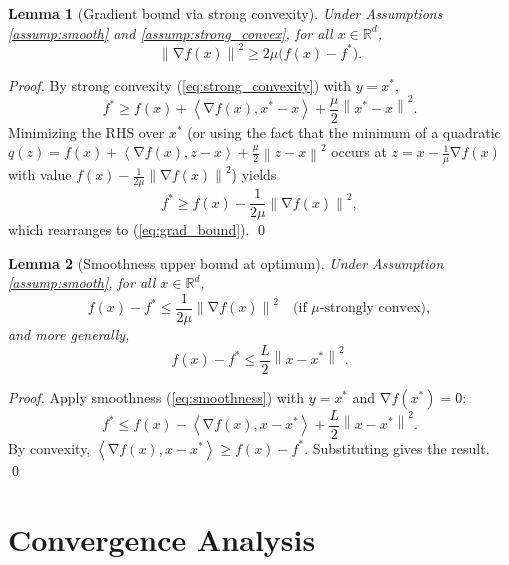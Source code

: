 \documentclass[11pt]{article}
\newtheorem{lemma}{Lemma}
\DeclareMathOperator{\grad}{\nabla}
\newcommand{\norm}[1]{\left\|#1\right\|}
\newcommand{\inner}[2]{\left\langle #1, #2 \right\rangle}
\newcommand{\R}{\mathbb{R}}
\begin{document}
\begin{lemma}[Gradient bound via strong convexity] \label{lem:grad_bound}
    Under Assumptions \ref{assump:smooth} and \ref{assump:strong_convex}, for all $x \in \R^d$,
    \begin{equation}
        \norm{\grad f(x)}^2 \ge 2\mu \bigl( f(x) - f^* \bigr).
        \label{eq:grad_bound}
    \end{equation}
\end{lemma}
\begin{proof}
    By strong convexity (\ref{eq:strong_convexity}) with $y = x^*$,
    \begin{equation}
        f^* \ge f(x) + \inner{\grad f(x)}{x^* - x} + \frac{\mu}{2}\norm{x^* - x}^2.
    \end{equation}
    Minimizing the RHS over $x^*$ (or using the fact that the minimum of a quadratic $q(z) = f(x) + \inner{\grad f(x)}{z-x} + \frac{\mu}{2}\norm{z-x}^2$ occurs at $z = x - \frac{1}{\mu}\grad f(x)$ with value $f(x) - \frac{1}{2\mu}\norm{\grad f(x)}^2$) yields
    \begin{equation}
        f^* \ge f(x) - \frac{1}{2\mu}\norm{\grad f(x)}^2,
    \end{equation}
    which rearranges to (\ref{eq:grad_bound}). \qed
\end{proof}

\begin{lemma}[Smoothness upper bound at optimum] \label{lem:smooth_opt}
    Under Assumption \ref{assump:smooth}, for all $x \in \R^d$,
    \begin{equation}
        f(x) - f^* \le \frac{1}{2\mu} \norm{\grad f(x)}^2 \quad \text{(if $\mu$-strongly convex)},
    \end{equation}
    and more generally,
    \begin{equation}
        f(x) - f^* \le \frac{L}{2} \norm{x - x^*}^2.
        \label{eq:smooth_opt}
    \end{equation}
\end{lemma}
\begin{proof}
    Apply smoothness (\ref{eq:smoothness}) with $y = x^*$ and $\grad f(x^*) = 0$:
    \begin{equation}
        f^* \le f(x) - \inner{\grad f(x)}{x - x^*} + \frac{L}{2}\norm{x - x^*}^2.
    \end{equation}
    By convexity, $\inner{\grad f(x)}{x - x^*} \ge f(x) - f^*$. Substituting gives the result. \qed
\end{proof}

\section{Convergence Analysis}
\end{document}
